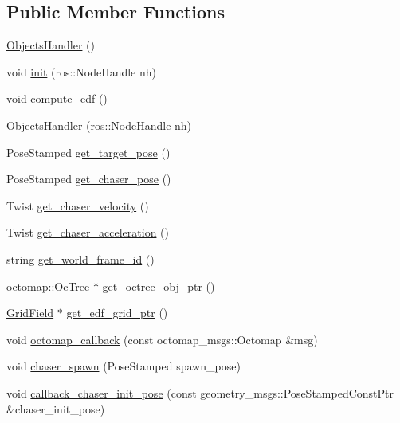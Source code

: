 \subsection*{Public Member Functions}
\begin{DoxyCompactItemize}
\item 
\hyperlink{class_objects_handler_a932c6bc722daa78f4f8e31894911c4c7}{Objects\+Handler} ()
\item 
void \hyperlink{class_objects_handler_a1ac7fcad5fa6033c2435ac49f2f9dff5}{init} (ros\+::\+Node\+Handle nh)
\item 
void \hyperlink{class_objects_handler_ae6da4f0f0a265c75722e02d68d519f07}{compute\+\_\+edf} ()
\item 
\hyperlink{class_objects_handler_a5d3298d7029619c1931d3dda34278e05}{Objects\+Handler} (ros\+::\+Node\+Handle nh)
\item 
Pose\+Stamped \hyperlink{class_objects_handler_a2b9e69afe54afea0380431d8f1f5142d}{get\+\_\+target\+\_\+pose} ()
\item 
Pose\+Stamped \hyperlink{class_objects_handler_a4ac7a7bb712575c2ff6ffbf37144cf56}{get\+\_\+chaser\+\_\+pose} ()
\item 
Twist \hyperlink{class_objects_handler_aa1af309b0e964ccb6df8dede045fa32b}{get\+\_\+chaser\+\_\+velocity} ()
\item 
Twist \hyperlink{class_objects_handler_a41d48832b07a4d4276147a99dd1d31bc}{get\+\_\+chaser\+\_\+acceleration} ()
\item 
string \hyperlink{class_objects_handler_a07e9d105db04be181661dc979314de3c}{get\+\_\+world\+\_\+frame\+\_\+id} ()
\item 
octomap\+::\+Oc\+Tree $\ast$ \hyperlink{class_objects_handler_a988bdf05045c40348b34ae8beecd8884}{get\+\_\+octree\+\_\+obj\+\_\+ptr} ()
\item 
\hyperlink{struct_grid_field}{Grid\+Field} $\ast$ \hyperlink{class_objects_handler_afe849882d1feeef8316a45632381da54}{get\+\_\+edf\+\_\+grid\+\_\+ptr} ()
\item 
void \hyperlink{class_objects_handler_a5744110d979850b3e2d8896793435d0c}{octomap\+\_\+callback} (const octomap\+\_\+msgs\+::\+Octomap \&msg)
\item 
void \hyperlink{class_objects_handler_a968feba95e0707919b6c3632781510ba}{chaser\+\_\+spawn} (Pose\+Stamped spawn\+\_\+pose)
\item 
void \hyperlink{class_objects_handler_a4c56416d3583b70d181d69d900b884b5}{callback\+\_\+chaser\+\_\+init\+\_\+pose} (const geometry\+\_\+msgs\+::\+Pose\+Stamped\+Const\+Ptr \&chaser\+\_\+init\+\_\+pose)

\end{DoxyCompactItemize}
